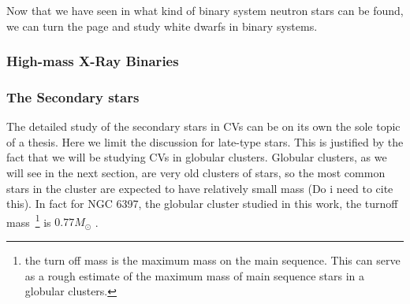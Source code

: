 Now that we have seen in what kind of binary system neutron stars can be found, we can turn the page and study white dwarfs in binary systems.   

\subsubsection{High-mass X-Ray Binaries}

\subsubsection{The Secondary stars}


The detailed study of the secondary stars in CVs can be on its own the sole topic of a thesis. Here we limit the discussion for late-type stars.  This is justified by the fact that we will be studying CVs in globular clusters. Globular clusters, as we will see in the next section, are very old clusters of stars, so the most common stars in the cluster are expected to have relatively small mass (Do i need to cite this). In fact for NGC 6397, the globular cluster studied in this work, the turnoff mass~\footnote{the turn off mass is the maximum mass on the main sequence. This can serve as a rough estimate of the maximum mass of main sequence stars in a globular clusters.} is $0.77 M_\odot$ \citep{de_marco_spectroscopic_2005}. 

